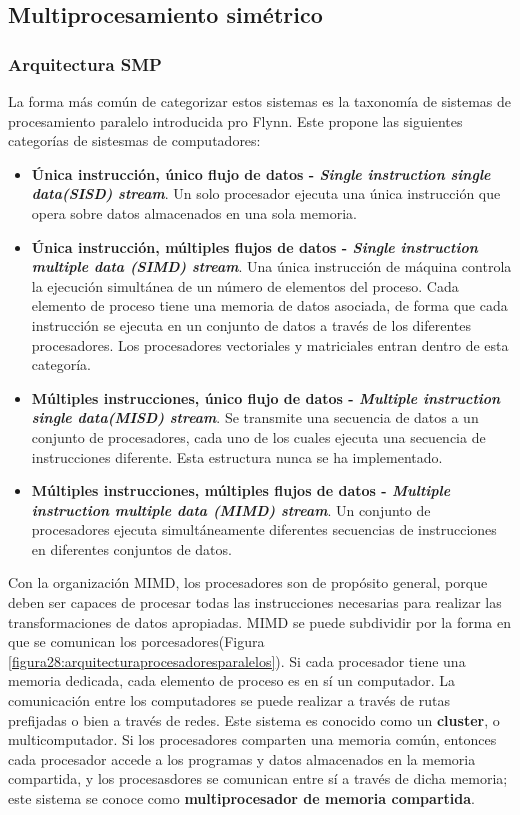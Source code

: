 \documentclass{article}
\begin{document}
		\subsection{Multiprocesamiento simétrico}
			\subsubsection{Arquitectura SMP}
				La forma más común de categorizar estos sistemas es la taxonomía de sistemas de procesamiento paralelo introducida pro Flynn. Este propone las siguientes categorías de sistesmas de computadores:
				\begin{itemize}
				\item \textbf{Única instrucción, único flujo de datos - \textit{Single instruction single data(SISD) stream}}. Un solo procesador ejecuta una única instrucción que opera sobre datos almacenados en una sola memoria.
				\item \textbf{Única instrucción, múltiples flujos de datos - \textit{Single instruction multiple data (SIMD) stream}}. Una única instrucción de máquina controla la ejecución simultánea de un número de elementos del proceso. Cada elemento de proceso tiene una memoria de datos asociada, de forma que cada instrucción se ejecuta en un conjunto de datos a través de los diferentes procesadores. Los procesadores vectoriales y matriciales entran dentro de esta categoría.
				\item \textbf{Múltiples instrucciones, único flujo de datos - \textit{Multiple instruction single data(MISD) stream}}. Se transmite una secuencia de datos a un conjunto de procesadores, cada uno de los cuales ejecuta una secuencia de instrucciones diferente. Esta estructura nunca se ha implementado.
				\item \textbf{Múltiples instrucciones, múltiples flujos de datos - \textit{Multiple instruction multiple data (MIMD) stream}}. Un conjunto de procesadores ejecuta simultáneamente diferentes secuencias de instrucciones en diferentes conjuntos de datos.
				\end{itemize}
				
				Con la organización MIMD, los procesadores son de propósito general, porque deben ser capaces de procesar todas las instrucciones necesarias para realizar las transformaciones de datos apropiadas. MIMD se puede subdividir por la forma en que se comunican los porcesadores(Figura	\ref{figura28:arquitecturaprocesadoresparalelos}). Si cada procesador tiene una memoria dedicada, cada elemento de proceso es en sí un computador. La comunicación entre los computadores se puede realizar a través de rutas prefijadas o bien a través de redes. Este sistema es conocido como un \textbf{cluster}, o multicomputador. Si los procesadores comparten una memoria común, entonces cada procesador accede a los programas y datos almacenados en la memoria compartida, y los procesasdores se comunican entre sí a través de dicha memoria; este sistema se conoce como \textbf{multiprocesador de memoria compartida}. \\
				
\end{document}
